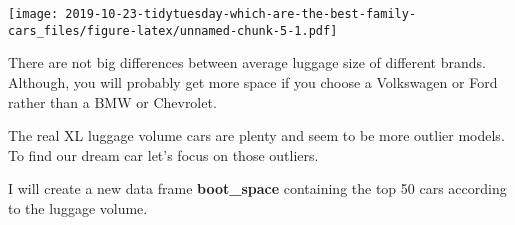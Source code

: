 \documentclass[]{article}
\newenvironment{Shaded}{\begin{snugshade}}{\end{snugshade}}
\newcommand{\CommentTok}[1]{\textcolor[rgb]{0.56,0.35,0.01}{\textit{#1}}}
\newcommand{\DataTypeTok}[1]{\textcolor[rgb]{0.13,0.29,0.53}{#1}}
\newcommand{\DecValTok}[1]{\textcolor[rgb]{0.00,0.00,0.81}{#1}}
\newcommand{\KeywordTok}[1]{\textcolor[rgb]{0.13,0.29,0.53}{\textbf{#1}}}
\newcommand{\NormalTok}[1]{#1}
\newcommand{\OperatorTok}[1]{\textcolor[rgb]{0.81,0.36,0.00}{\textbf{#1}}}
\newcommand{\OtherTok}[1]{\textcolor[rgb]{0.56,0.35,0.01}{#1}}
\newcommand{\StringTok}[1]{\textcolor[rgb]{0.31,0.60,0.02}{#1}}
\begin{document}
\begin{Shaded}
\end{Shaded}

\texttt{[image: 2019-10-23-tidytuesday-which-are-the-best-family-cars\_files/figure-latex/unnamed-chunk-5-1.pdf]}

There are not big differences between average luggage size of different
brands. Although, you will probably get more space if you choose a
Volkswagen or Ford rather than a BMW or Chevrolet.

The real XL luggage volume cars are plenty and seem to be more outlier
models. To find our dream car let's focus on those outliers.

I will create a new data frame \textbf{boot\_space} containing the top
50 cars according to the luggage volume.
\end{document}

